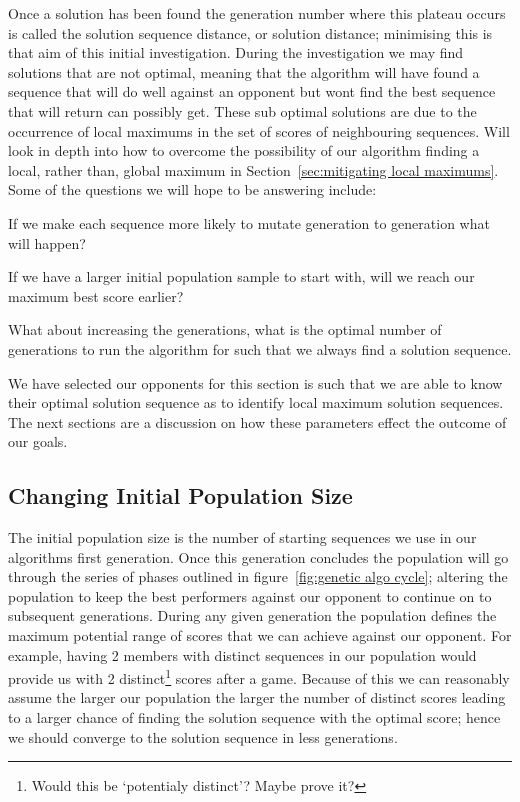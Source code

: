 Once a solution has been found the generation number where this plateau occurs is called the solution sequence distance, or solution distance; minimising this is that aim of this initial investigation.
During the investigation we may find solutions that are not optimal, meaning that the algorithm will have found a sequence that will do well against an opponent but wont find the best sequence that will return  can possibly get.
These sub optimal solutions are due to the occurrence of local maximums in the set of scores of neighbouring sequences. 
Will look in depth into how to overcome the possibility of our algorithm finding a local, rather than, global maximum in Section~\ref{sec:mitigating local maximums}.
Some of the questions we will hope to be answering include:
\begin{itemize}
    \begin{item}
        If we make each sequence more likely to mutate generation to generation what will happen?        
    \end{item}
    \begin{item}
        If we have a larger initial population sample to start with, will we reach our maximum best score earlier?
    \end{item}
    \begin{item}
        What about increasing the generations, what is the optimal number of generations to run the algorithm for such that we always find a solution sequence.        
    \end{item}
\end{itemize}

We have selected our opponents for this section is such that we are able to know their optimal solution sequence as to identify local maximum solution sequences. The next sections are a discussion on how these parameters effect the outcome of our goals. \\ 

\subsection{Changing Initial Population Size}
The initial population size is the number of starting sequences we use in our algorithms first generation.
Once this generation concludes the population will go through the series of phases outlined in figure~\ref{fig:genetic algo cycle}; altering the population to keep the best performers against our opponent to continue on to subsequent generations.
During any given generation the population defines the maximum potential range of scores that we can achieve against our opponent.
For example, having 2 members with distinct sequences in our population would provide us with 2 distinct\footnote{Would this be `potentialy distinct'? Maybe prove it?} scores after a game.
Because of this we can reasonably assume the larger our population the larger the number of distinct scores leading to a larger chance of finding the solution sequence with the optimal score; hence we should converge to the solution sequence in less generations.\\

